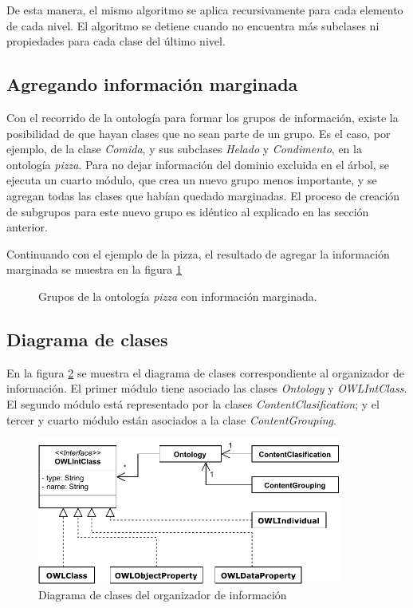 De esta manera, el mismo algoritmo se aplica recursivamente para cada elemento de cada nivel. El algoritmo se detiene cuando no encuentra más subclases ni propiedades para cada clase del último nivel.

\subsection{Agregando información marginada}
Con el recorrido de la ontología para formar los grupos de información, existe la posibilidad de que hayan clases que no sean parte de un grupo. Es el caso, por ejemplo, de la clase \emph{Comida}, y sus subclases \emph{Helado} y \emph{Condimento}, en la ontología \emph{pizza}. Para no dejar información del dominio excluida en el árbol, se ejecuta un cuarto módulo, que crea un nuevo grupo menos importante, y se agregan todas las clases que habían quedado marginadas. El proceso de creación de subgrupos para este nuevo grupo es idéntico al explicado en las sección anterior.

Continuando con el ejemplo de la pizza, el resultado de agregar la  información marginada se muestra en la figura \ref{fig:macro_planning_pizza_marg}

\begin{figure}[H]
\caption{Grupos de la ontología \emph{pizza} con información marginada.}
\label{fig:macro_planning_pizza_marg}
\end{figure}

\subsection{Diagrama de clases}
En la figura \ref{fig:diagrama_clases_organizador} se muestra el diagrama de clases correspondiente al organizador de información. El primer módulo tiene asociado las clases \emph{Ontology} y \emph{OWLIntClass}. El segundo módulo está representado por la clases \emph{ContentClasification}; y el tercer y cuarto módulo están asociados a la clase \emph{ContentGrouping}.

\begin{figure}[H]
    \centering
    \includegraphics[width=10cm]{img/organizacion_informacion/clases_organizador_informacion.pdf}
    \caption{Diagrama de clases del organizador de información}
    \label{fig:diagrama_clases_organizador}
\end{figure}

